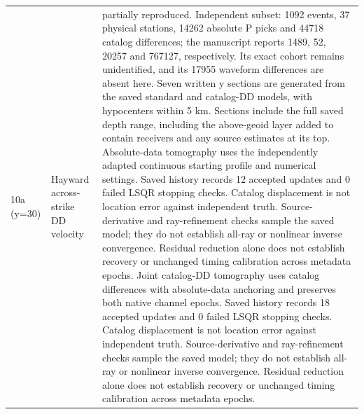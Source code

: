 \begin{longtable}{>{\raggedright\arraybackslash}p{}>{\raggedright\arraybackslash}p{}>{\raggedright\arraybackslash}p{}}
10a (y=30) & Hayward across-strike DD velocity & partially reproduced. Independent subset: 1092 events, 37 physical stations, 14262 absolute P picks and 44718 catalog differences; the manuscript reports 1489, 52, 20257 and 767127, respectively. Its exact cohort remains unidentified, and its 17955 waveform differences are absent here. Seven written y sections are generated from the saved standard and catalog-DD models, with hypocenters within 5 km. Sections include the full saved depth range, including the above-geoid layer added to contain receivers and any source estimates at its top. Absolute-data tomography uses the independently adapted continuous starting profile and numerical settings. Saved history records 12 accepted updates and 0 failed LSQR stopping checks. Catalog displacement is not location error against independent truth. Source-derivative and ray-refinement checks sample the saved model; they do not establish all-ray or nonlinear inverse convergence. Residual reduction alone does not establish recovery or unchanged timing calibration across metadata epochs. Joint catalog-DD tomography uses catalog differences with absolute-data anchoring and preserves both native channel epochs. Saved history records 18 accepted updates and 0 failed LSQR stopping checks. Catalog displacement is not location error against independent truth. Source-derivative and ray-refinement checks sample the saved model; they do not establish all-ray or nonlinear inverse convergence. Residual reduction alone does not establish recovery or unchanged timing calibration across metadata epochs.\\

\end{longtable}
